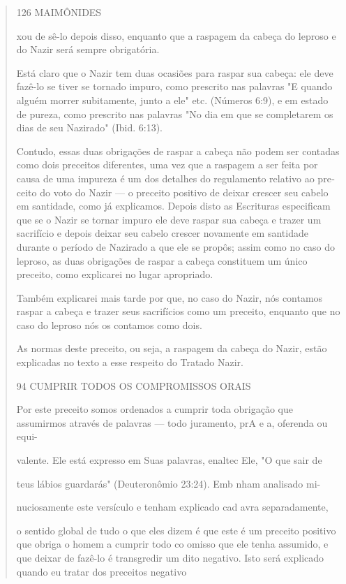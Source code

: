 \begin{quote}
126 MAIMÔNIDES

xou de sê-lo depois disso, enquanto que a raspagem da cabeça do leproso
e do Nazir será sempre obrigatória.

Está claro que o Nazir tem duas ocasiões para raspar sua cabeça: ele
deve fazê-lo se tiver se tornado impuro, como prescrito nas palavras "E
quan­do alguém morrer subitamente, junto a ele" etc. (Números 6:9), e em
estado de pureza, como prescrito nas palavras "No dia em que se
completarem os dias de seu Nazirado" (Ibid. 6:13).

Contudo, essas duas obrigações de raspar a cabeça não podem ser contadas
como dois preceitos diferentes, uma vez que a raspagem a ser feita por
causa de uma impureza é um dos detalhes do regulamento relativo ao
pre­ceito do voto do Nazir --- o preceito positivo de deixar crescer seu
cabelo em santidade, como já explicamos. Depois disto as Escrituras
especificam que se o Nazir se tornar impuro ele deve raspar sua cabeça e
trazer um sacrifício e de­pois deixar seu cabelo crescer novamente em
santidade durante o período de Nazirado a que ele se propôs; assim como
no caso do leproso, as duas obriga­ções de raspar a cabeça constituem um
único preceito, como explicarei no lu­gar apropriado.

Também explicarei mais tarde por que, no caso do Nazir, nós conta­mos
raspar a cabeça e trazer seus sacrifícios como um preceito, enquanto que
no caso do leproso nós os contamos como dois.

As normas deste preceito, ou seja, a raspagem da cabeça do Nazir, estão
explicadas no texto a esse respeito do Tratado Nazir.

94 CUMPRIR TODOS OS COMPROMISSOS ORAIS

Por este preceito somos ordenados a cumprir toda obrigação que
assumirmos através de palavras --- todo juramento, prA e a, oferenda ou
equi-

valente. Ele está expresso em Suas palavras, enaltec Ele, "O que sair de

teus lábios guardarás" (Deuteronômio 23:24). Emb nham analisado mi-

nuciosamente este versículo e tenham explicado cad avra separadamente,

o sentido global de tudo o que eles dizem é que este é um preceito
positivo que obriga o homem a cumprir todo co omisso que ele tenha
assumido, e que deixar de fazê-lo é transgredir um dito negativo. Isto
será explicado quando eu tratar dos preceitos negativo


\end{quote}
